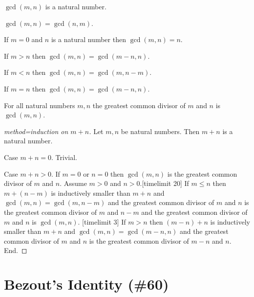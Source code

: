 \documentclass{article}
\begin{document}
\begin{forthel}
\begin{signature}
$\gcd(m,n)$ is a natural number.
\end{signature}

\begin{axiom}
$\gcd(m,n) = \gcd(n,m)$.
\end{axiom}

\begin{axiom}
If $m=0$ and $n$ is a natural number then $\gcd(m,n)=n$.
\end{axiom}
\begin{axiom}
If $m > n$ then $\gcd(m,n) = \gcd(m-n,n)$.
\end{axiom}
\begin{axiom}
If $m < n$ then $\gcd(m,n) = \gcd(m,n-m)$.
\end{axiom}
\begin{axiom}
If $m = n$ then $\gcd(m,n) = \gcd(m-n,n)$.
\end{axiom}


\begin{proposition}
For all natural numbers $m,n$ the greatest common divisor of $m$ and $n$ is $\gcd(m,n)$.
\end{proposition}
\begin{proof}[method=induction on $m+n$]
Let $m,n$ be natural numbers.
Then $m+n$ is a natural number.

Case $m + n =0$. Trivial.

Case $m + n > 0$.
If $m=0$ or $n=0$ then $\gcd(m,n)$ is
the greatest common divisor of $m$ and $n$.
Assume $m>0$ and $n>0$.[timelimit 20]
If $m \leq n$ then $m + (n-m)$ is inductively smaller than $m + n$ and
$\gcd(m,n) = \gcd(m,n-m)$ and
the greatest common divisor of $m$ and $n$ is
the greatest common divisor of $m$ and $n-m$
and the greatest common divisor of $m$ and $n$ is $\gcd(m,n)$. [timelimit 3]
If $m > n$ then $(m-n) + n$ is inductively smaller than $m + n$ and
$\gcd(m,n) = \gcd(m-n,n)$ and
the greatest common divisor of $m$ and $n$ is
the greatest common divisor of $m-n$ and $n$. End.
\end{proof}
\end{forthel}


\section{Bezout's Identity (\#60)}
\end{document}
